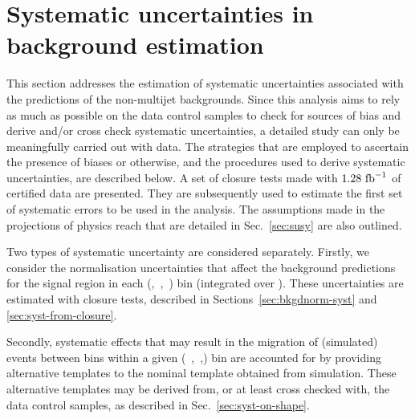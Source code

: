 \section{Systematic uncertainties in background estimation}
\label{sec:systematics}

This section addresses the estimation of systematic uncertainties
associated with the predictions of the non-multijet backgrounds. Since
this analysis aims to rely as much as possible on the data control
samples to check for sources of bias and derive and/or cross check
systematic uncertainties, a detailed study can only be meaningfully
carried out with data. The strategies that are employed to
ascertain the presence of biases or otherwise, and the procedures used
to derive systematic uncertainties, are described below. 
A set of closure tests made with $1.28~\text{fb}^{-1}$ of certified
data are presented. They are subsequently used to estimate the first
set of systematic errors to be used in the analysis. The assumptions made in 
the projections of physics reach
that are detailed in Sec.~\ref{sec:susy} are also outlined.

Two types of systematic uncertainty are considered separately.
Firstly, we consider
the normalisation uncertainties that affect the background predictions for
the signal region in each (\nb,~\njet,~\scalht) bin (integrated over
\mht).
These uncertainties are estimated with closure tests, described in
Sections~\ref{sec:bkgdnorm-syst} and \ref{sec:syst-from-closure}.

Secondly, systematic effects that may result in the migration of
(simulated) events between \mht bins within a given (\njet~,\nb~,\scalht)
bin are accounted for by providing alternative templates to the nominal
\mht template obtained from simulation. These alternative \mht
templates may be derived from, or at least cross checked with, the
data control samples, as described in Sec.~\ref{sec:syst-on-shape}.

